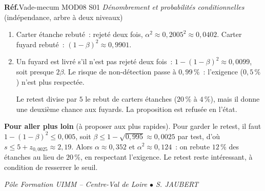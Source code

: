 \documentclass[a4paper,11pt]{article}
\newcommand{\source}[1]{{\footnotesize\color{uimmgray}\textbf{Réf.}\enspace #1}\par\smallskip}
\newcommand{\VM}{Vade-mecum MOD08 S01 \textit{Dénombrement et probabilités conditionnelles}}
\begin{document}
\needspace{7cm}
\begin{correction}[-- Question 4]
\source{\VM{} (indépendance, arbre à deux niveaux)}
\begin{enumerate}[label=\alph*), leftmargin=14pt, itemsep=2pt]
  \item Carter étanche rebuté~: rejeté deux fois, $\alpha^2 \approx 0{,}2005^2 \approx 0{,}0402$. Carter fuyard rebuté~: $(1 - \beta)^2 \approx 0{,}9901$.
  \item Un fuyard est livré s'il n'est pas rejeté deux fois~: $1 - (1 - \beta)^2 \approx 0{,}0099$, soit presque $2\beta$. Le risque de non-détection passe à $0{,}99\,\%$~: l'exigence ($0{,}5\,\%$) n'est plus respectée.

  Le retest divise par $5$ le rebut de carters étanches ($20\,\%$ à $4\,\%$), mais il donne une deuxième chance aux fuyards. La proposition est refusée en l'état.
\end{enumerate}
\textbf{Pour aller plus loin} (à proposer aux plus rapides). Pour garder le retest, il faut $1 - (1-\beta)^2 \leq 0{,}005$, soit $\beta \leq 1 - \sqrt{0{,}995} \approx 0{,}0025$ par test, d'où $s \leq 5 + z_{0{,}0025} \approx 2{,}19$. Alors $\alpha \approx 0{,}352$ et $\alpha^2 \approx 0{,}124$~: on rebute $12\,\%$ des étanches au lieu de $20\,\%$, en respectant l'exigence. Le retest reste intéressant, à condition de resserrer le seuil.
\end{correction}

\vfill
\begin{center}\color{uimmgray}\small
\textit{Pôle Formation UIMM -- Centre-Val de Loire $\bullet$ S. JAUBERT}
\end{center}
\end{document}
